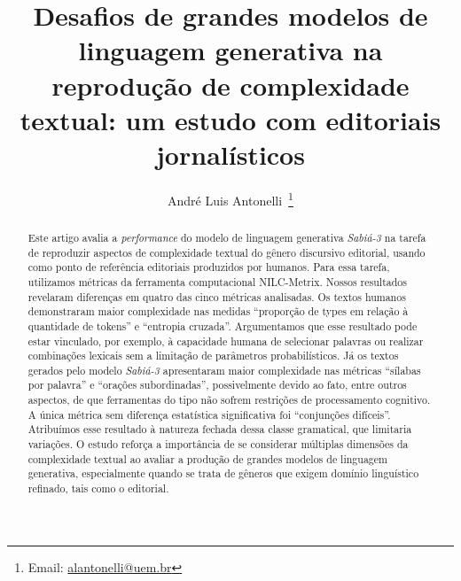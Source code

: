 \documentclass[portuguese]{textolivre}
\title{Desafios de grandes modelos de linguagem generativa na reprodução de complexidade textual: um estudo com editoriais jornalísticos}
\author[1]{André Luis Antonelli~\orcid{0000-0002-7896-5465}\thanks{Email: \href{mailto:alantonelli@uem.br}{alantonelli@uem.br}}}
\affil[1]{Universidade Estadual de Maringá, Departamento de Língua Portuguesa, Maringá, PR, Brasil.}
\begin{document}
\maketitle

\begin{polyabstract}
\begin{abstract}
Este artigo avalia a \emph{performance} do modelo de linguagem generativa \emph{Sabiá-3} na tarefa de reproduzir aspectos de complexidade textual do gênero discursivo editorial, usando como ponto de referência editoriais produzidos por humanos.
Para essa tarefa, utilizamos métricas da ferramenta computacional NILC-Metrix.
Nossos resultados revelaram diferenças em quatro das cinco métricas analisadas.
Os textos humanos demonstraram maior complexidade nas medidas ``proporção de types em relação à quantidade de tokens'' e ``entropia cruzada''.
Argumentamos que esse resultado pode estar vinculado, por exemplo, à capacidade humana de selecionar palavras ou realizar combinações lexicais sem a limitação de parâmetros probabilísticos.
Já os textos gerados pelo modelo \emph{Sabiá-3} apresentaram maior complexidade nas métricas ``sílabas por palavra'' e ``orações subordinadas'', possivelmente devido ao fato, entre outros aspectos, de que ferramentas do tipo não sofrem restrições de processamento cognitivo.
A única métrica sem diferença estatística significativa foi ``conjunções difíceis''.
Atribuímos esse resultado à natureza fechada dessa classe gramatical, que limitaria variações.
O estudo reforça a importância de se considerar múltiplas dimensões da complexidade textual ao avaliar a produção de grandes modelos de linguagem generativa, especialmente quando se trata de gêneros que exigem domínio linguístico refinado, tais como o editorial.

\end{abstract}


\end{polyabstract}
\end{document}

